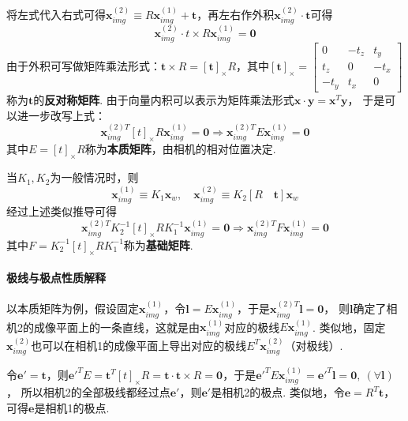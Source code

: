 \documentclass[12pt, a4paper, oneside]{ctexart}
\numberwithin{equation}{section}  %
\theoremstyle{definition}
\def\bd{\boldsymbol}        %
\def\add{\vspace{1ex}}      %
\begin{document}
将左式代入右式可得$\bd{x}^{(2)}_{img}\equiv R\bd{x}^{(1)}_{img} + \bd{t}$，再左右作外积$\bd{x}^{(2)}_{img}\cdot \bd{t}$可得
\begin{equation*}
    \bd{x}^{(2)}_{img}\cdot t\times R\bd{x}^{(1)}_{img} = \bd{0}
\end{equation*}
由于外积可写做矩阵乘法形式：$\bd{t}\times R = [\bd{t}]_{\times}R$，其中$[\bd{t}]_{\times} = \begin{bmatrix}
    0&-t_z&t_y\\
    t_z&0&-t_x\\
    -t_y&t_x&0
\end{bmatrix}$称为$\bd{t}$的\textbf{反对称矩阵}. 由于向量内积可以表示为矩阵乘法形式$\bd{x}\cdot \bd{y} = \bd{x}^T\bd{y}$，
于是可以进一步改写上式：
\begin{equation*}
    \bd{x}^{(2)T}_{img}[t]_{\times}R\bd{x}^{(1)}_{img}=  \bd{0}\Rightarrow \bd{x}^{(2)T}_{img}E\bd{x}^{(1)}_{img} = \bd{0}
\end{equation*}
其中$E = [t]_{\times}R$称为\textbf{本质矩阵}，由相机的相对位置决定.

当$K_1,K_2$为一般情况时，则
\begin{equation*}
    \bd{x}^{(1)}_{img}\equiv K_1\bd{x}_w,\quad \bd{x}^{(2)}_{img}\equiv K_2[R\quad \bd{t}]\bd{x}_w
\end{equation*}
经过上述类似推导可得
\begin{equation*}
    \bd{x}^{(2)T}_{img}K_2^{-1}[t]_{\times}RK_1^{-1}\bd{x}^{(1)}_{img} = \bd{0}\Rightarrow \bd{x}^{(2)T}_{img}F\bd{x}^{(1)}_{img} = \bd{0}
\end{equation*}
其中$F = K_2^{-1}[t]_{\times}RK_1^{-1}$称为\textbf{基础矩阵}.

\paragraph{极线与极点性质解释}以本质矩阵为例，\add 假设固定$\bd{x}^{(1)}_{img}$，令$\bd{l} = E\bd{x}^{(1)}_{img}$，于是$\bd{x}^{(2)T}_{img}\bd{l} = \bd{0}$，
则$\bd{l}$确定了相机2的成像平面上的一条直线，\add 这就是由$\bd{x}^{(1)}_{img}$对应的极线$E\bd{x}^{(1)}_{img}$.
类似地，固定$\bd{x}^{(2)}_{img}$也可以在相机1的成像平面上导出对应的极线$E^T\bd{x}^{(2)}_{img}$（对极线）.

令$\bd{e}' = \bd{t}$，则$\bd{e}'^TE= \bd{t}^T[t]_{\times}R = \bd{t}\cdot\bd{t}\times R = \bd{0}$，于是$\bd{e}'^TE\bd{x}^{(1)}_{img} = \bd{e}'^T\bd{l} = \bd{0},\ (\forall \bd{l})$，
所以相机2的全部极线都经过点$\bd{e}'$，则$\bd{e}'$是相机2的极点. 类似地，令$\bd{e} = R^T\bd{t}$，可得$\bd{e}$是相机1的极点.
\end{document}
